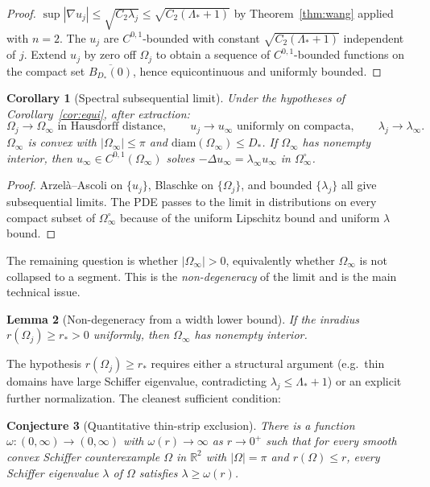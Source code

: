 \documentclass[11pt]{article}
\newcommand{\R}{\mathbb{R}}
\newcommand{\Om}{\Omega}
\newcommand{\1}{\mathbf 1}
\newcommand{\diam}{\mathrm{diam}}
\newtheorem{lem}{Lemma}
\newtheorem{cor}[lem]{Corollary}
\newtheorem{conj}[lem]{Conjecture}
\begin{document}
\begin{proof}
$\sup|\nabla u_j|\le \sqrt{C_2\lambda_j}\le \sqrt{C_2(\Lambda_*+1)}$
by Theorem~\ref{thm:wang} applied with $n=2$. The $u_j$ are
$C^{0,1}$-bounded with constant $\sqrt{C_2(\Lambda_*+1)}$
independent of $j$. Extend $u_j$ by zero off $\Om_j$ to obtain a
sequence of $C^{0,1}$-bounded functions on the compact set
$\overline{B_{D_*}(0)}$, hence equicontinuous and uniformly bounded.
\end{proof}

\begin{cor}[Spectral subsequential limit]\label{cor:speclim}
Under the hypotheses of Corollary~\ref{cor:equi}, after extraction:
\[
    \Om_j\to\Om_\infty\text{ in Hausdorff distance},\qquad
    u_j\to u_\infty\text{ uniformly on compacta},\qquad
    \lambda_j\to\lambda_\infty.
\]
$\Om_\infty$ is convex with $|\Om_\infty|\le\pi$ and
$\diam(\Om_\infty)\le D_*$. If $\Om_\infty$ has nonempty interior,
then $u_\infty\in C^{0,1}(\Om_\infty)$ solves
$-\Delta u_\infty=\lambda_\infty u_\infty$ in $\Om_\infty^\circ$.
\end{cor}

\begin{proof}
Arzel\`a--Ascoli on $\{u_j\}$, Blaschke on $\{\Om_j\}$, and bounded
$\{\lambda_j\}$ all give subsequential limits. The PDE passes
to the limit in distributions on every compact subset of
$\Om_\infty^\circ$ because of the uniform Lipschitz bound and
uniform $\lambda$ bound.
\end{proof}

The remaining question is whether $|\Om_\infty|>0$, equivalently
whether $\Om_\infty$ is not collapsed to a segment. This is the
\emph{non-degeneracy} of the limit and is the main technical issue.

\begin{lem}[Non-degeneracy from a width lower bound]\label{lem:nondeg}
If the inradius $r(\Om_j)\ge r_*>0$ uniformly, then $\Om_\infty$ has
nonempty interior.
\end{lem}

The hypothesis $r(\Om_j)\ge r_*$ requires either a structural
argument (e.g.\ thin domains have large Schiffer eigenvalue,
contradicting $\lambda_j\le\Lambda_*+1$) or an explicit further
normalization. The cleanest sufficient condition:

\begin{conj}[Quantitative thin-strip exclusion]\label{conj:thinstrip}
There is a function $\omega:(0,\infty)\to(0,\infty)$ with
$\omega(r)\to\infty$ as $r\to 0^+$ such that for every smooth convex
Schiffer counterexample $\Om$ in $\R^2$ with $|\Om|=\pi$ and
$r(\Om)\le r$, every Schiffer eigenvalue $\lambda$ of $\Om$ satisfies
$\lambda\ge\omega(r)$.
\end{conj}
\end{document}
